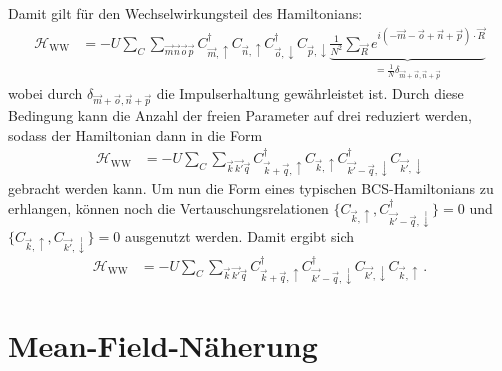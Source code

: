 Damit gilt für den Wechselwirkungsteil des Hamiltonians:
\begin{align}
    \mathcal{H}_\text{WW} &= -U \sum_C \sum_{\vec{m}\vec{n}\vec{o}\vec{p}} C_{\vec{m}, \uparrow}^\dagger C_{\vec{n}, \uparrow} C_{\vec{o}, \downarrow}^\dagger C_{\vec{p}, \downarrow} \underbrace{\frac{1}{N^2} \sum_{\vec{R}} e^{i(-\vec{m}-\vec{o} + \vec{n} + \vec{p} )\cdot \vec{R}}}_{= \frac{1}{N} \delta_{\vec{m}+\vec{o}, \vec{n} + \vec{p}}} 
\end{align}
wobei durch $\delta_{\vec{m}+\vec{o}, \vec{n} + \vec{p}}$ die Impulserhaltung gewährleistet ist. Durch diese Bedingung kann die Anzahl der freien Parameter auf drei reduziert werden, sodass der Hamiltonian dann in die Form
\begin{align}
    \mathcal{H}_\text{WW} &= -U \sum_C \sum_{\vec{k}\, \vec{k'} \vec{q} } C_{\vec{k}+\vec{q}, \uparrow}^\dagger C_{\vec{k}, \uparrow} C_{\vec{k'} - \vec{q}, \downarrow}^\dagger C_{\vec{k'}, \downarrow}
\end{align}
gebracht werden kann. Um nun die Form eines typischen BCS-Hamiltonians zu erhlangen, können noch die Vertauschungsrelationen $\{C_{\vec{k}, \uparrow} ,C_{\vec{k'} - \vec{q}, \downarrow}^\dagger\} = 0$ und $\{C_{\vec{k}, \uparrow}, C_{\vec{k'}, \downarrow}\} = 0$ ausgenutzt werden. Damit ergibt sich
\begin{align}
    \mathcal{H}_\text{WW} &= -U \sum_C \sum_{\vec{k}\, \vec{k'} \vec{q} } C_{\vec{k}+\vec{q}, \uparrow}^\dagger C_{\vec{k'} - \vec{q}, \downarrow}^\dagger C_{\vec{k'}, \downarrow} C_{\vec{k}, \uparrow} \, . \label{eq:H_ww}
\end{align}

\section{Mean-Field-Näherung}


